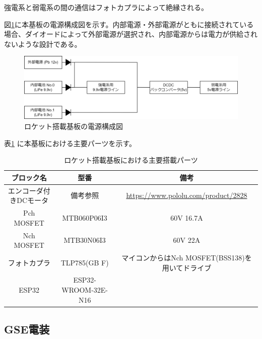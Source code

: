 \documentclass[dvipdfmx,a4j]{jsarticle}
\begin{document}
強電系と弱電系の間の通信はフォトカプラによって絶縁される。

図\ref{powerSupplyChart}に本基板の電源構成図を示す。内部電源・外部電源がともに接続されている場合、ダイオードによって外部電源が選択され、内部電源からは電力が供給されないような設計である。

\begin{figure}[htbp]
    \centering
    \includegraphics[width = 15cm]{figures/powerSupplyChart.drawio.png}
    \caption{ロケット搭載基板の電源構成図}
    \label{powerSupplyChart}
\end{figure}

表\ref{newGenPropulsionBRDPartList} に本基板における主要パーツを示す。

\begin{table}[htbp]
    \begin{tabular}{c|c|c}
        \hline
        ブロック名        & 型番                  & 備考                                        \\ \hline \hline
        エンコーダ付きDCモータ & 備考参照                & \url{https://www.pololu.com/product/2828} \\ \hline
        Pch MOSFET   & MTB060P06I3         & 60V 16.7A                                 \\ \hline
        Nch MOSFET   & MTB30N06I3          & 60V 22A                                   \\ \hline
        フォトカプラ       & TLP785(GB F)        & マイコンからはNch MOSFET(BSS138)を用いてドライブ         \\ \hline
        ESP32        & ESP32-WROOM-32E-N16 &                                           \\
        \hline
    \end{tabular}
    \caption{ロケット搭載基板における主要搭載パーツ}
    \label{newGenPropulsionBRDPartList}
\end{table}


\subsection{GSE電装}
\end{document}
